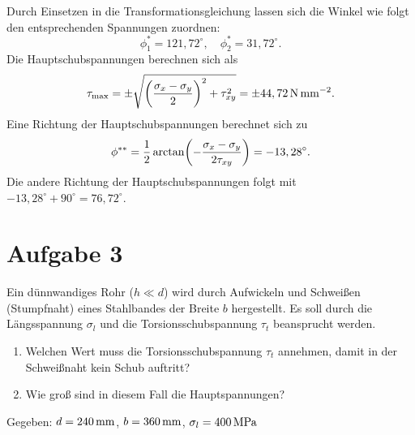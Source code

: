 \documentclass{exercise}
\begin{document}
\begin{enumerate}
        Durch Einsetzen in die Transformationsgleichung lassen sich die Winkel wie folgt den entsprechenden Spannungen zuordnen:
        \[
            \phi_1^* = 121,72^\circ, \quad \phi_2^* = 31,72^\circ.
        \]
        Die Hauptschubspannungen berechnen sich als
        \[
            \tau_{\text{max}} = \pm\sqrt{\parentheses*{\frac{\sigma_x - \sigma_y}{2}}^2 + \tau_{xy}^2} = \pm 44,72\sis{\newton\per\milli\meter\squared}.
        \]
        Eine Richtung der Hauptschubspannungen berechnet sich zu
        \[
            \phi^{**} = \frac{1}{2}\arctan\parentheses*{-\frac{\sigma_x - \sigma_y}{2\tau_{xy}}} = -13,28^\circ.
        \]
        Die andere Richtung der Hauptschubspannungen folgt mit \(-13,28^\circ + 90^\circ = 76,72^\circ\).
    \end{enumerate}


    \section*{Aufgabe 3}

    \begin{problem}
        Ein dünnwandiges Rohr (\(h \ll d\)) wird durch Aufwickeln und Schweißen (Stumpfnaht) eines Stahlbandes der Breite \(b\) hergestellt.
        Es soll durch die Längsspannung \(\sigma_l\) und die Torsionsschubspannung \(\tau_t\) beansprucht werden.
        \begin{enumerate}
            \item Welchen Wert muss die Torsionsschubspannung \(\tau_t\) annehmen, damit in der Schweißnaht kein Schub auftritt?
            \item Wie groß sind in diesem Fall die Hauptspannungen?
        \end{enumerate}
        Gegeben: \(d = 240\sis{\milli\meter}\), \(b = 360\sis{\milli\meter}\), \(\sigma_l = 400\sis{\mega\pascal}\)
    \end{problem}
\end{document}
